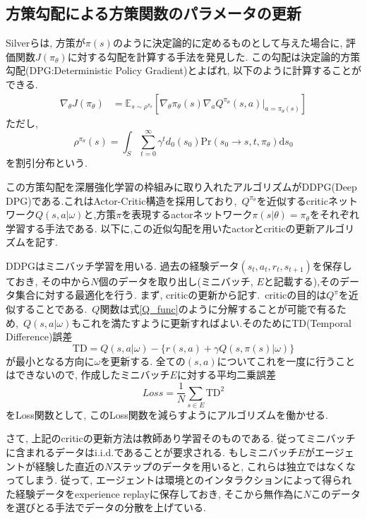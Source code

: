 \documentclass[dvipdfmx]{ampmt}
\newcommand{\expect}{\mathbb{E}}
\begin{document}
\subsection{方策勾配による方策関数のパラメータの更新}
Silverら\cite{DPG}は, 方策が$\pi(s)$のように決定論的に定めるものとして与えた場合に, 評価関数$J(\pi_{\theta})$に対する勾配を計算する手法を発見した. この勾配は決定論的方策勾配(DPG:Deterministic Policy Gradient)とよばれ, 以下のように計算することができる.
\begin{align}
	\nabla_{\theta}J(\pi_{\theta}) &= \expect_{s\sim\rho^{\pi_{\theta}}}[
	\nabla_{\theta}\pi_{\theta}(s)\nabla_{a}Q^{\pi_{\theta}}(s, a)|_{a=\pi_{\theta}(s)}] \label{true_pg} 
\end{align}
ただし, 
\begin{equation}
	\rho^{\pi_{\theta}}(s) = \int_{S}\sum_{t=0}^{\infty}\gamma^td_0(s_0)\textrm{Pr}(s_0\to s, t,  \pi_{\theta})\textrm{d}s_0
\end{equation}
を割引分布という.\par
この方策勾配を深層強化学習の枠組みに取り入れたアルゴリズムがDDPG(Deep DPG)\cite{DDPG}である.これはActor-Critic構造を採用しており,~$Q^{\pi_{\theta}}$を近似するcriticネットワーク$Q(s,a|\omega)$と,方策$\pi$を表現するactorネットワーク$\pi(s|\theta)=\pi_{\theta}$をそれぞれ学習する手法である. 以下に,この近似勾配を用いたactorとcriticの更新アルゴリズムを記す.\par
DDPGはミニバッチ学習を用いる. 過去の経験データ$(s_t, a_t, r_t, s_{t+1})$を保存しておき, その中から$N$個のデータを取り出し(ミニバッチ, $E$と記載する),そのデータ集合に対する最適化を行う. まず, criticの更新から記す.~criticの目的は$Q^{\pi}$を近似することである.~$Q$関数は式\eqref{Q_func}のように分解することが可能で有るため,~$Q(s,a|\omega)$もこれを満たすように更新すればよい.そのためにTD(Temporal Difference)誤差
\begin{equation}
	\textrm{TD} = Q(s,a|\omega) - \{r(s,a)+\gamma Q(s,\pi(s)|\omega)\}
\end{equation}
が最小となる方向に$\omega$を更新する. 全ての$(s,a)$についてこれを一度に行うことはできないので, 作成したミニバッチ$E$に対する平均二乗誤差
\begin{equation}
	Loss = \frac{1}{N}\sum_{s\in E} \textrm{TD}^2
\end{equation}
をLoss関数として, このLoss関数を減らすようにアルゴリズムを働かせる. \par
さて, 上記のcriticの更新方法は教師あり学習そのものである. 従ってミニバッチに含まれるデータはi.i.d.であることが要求される. もしミニバッチ$E$がエージェントが経験した直近の$N$ステップのデータを用いると, これらは独立ではなくなってしまう. 従って, エージェントは環境とのインタラクションによって得られた経験データをexperience replayに保存しておき, そこから無作為に$N$このデータを選びとる手法でデータの分散を上げている.\par
\end{document}
